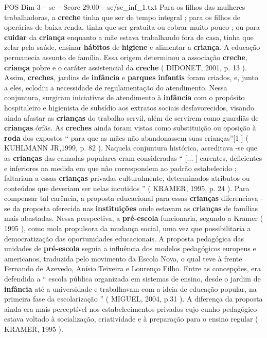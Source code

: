 \begin{textsample}{POS Dim 3 – se – Score 29.00 – se/se\_inf\_1.txt}
Para os filhos das mulheres trabalhadoras, a \textbf{creche} tinha que ser de tempo integral ; para os filhos de operárias de baixa renda, tinha que ser gratuita ou cobrar muito pouco ; ou para \textbf{cuidar} da \textbf{criança} enquanto a mãe estava trabalhando fora de casa, tinha que zelar pela saúde, ensinar \textbf{hábitos} de \textbf{higiene} e alimentar a \textbf{criança}.
A educação permanecia assunto de família.
Essa origem determinou a associação \textbf{creche}, \textbf{criança} pobre e o caráter assistencial da \textbf{creche} ( DIDONET, 2001, p. 13 ).
Assim, \textbf{creches}, jardins de \textbf{infância} e \textbf{parques} \textbf{infantis} foram criados, e, junto a eles, eclodiu a necessidade de regulamentação do atendimento.
Nessa conjuntura, surgiram iniciativas de atendimento à \textbf{infância} com o propósito hospitaleiro e higienista de subsídio aos extratos sociais desfavorecidos, visando ainda afastar as \textbf{crianças} do trabalho servil, além de servirem como guardiãs de \textbf{crianças} órfãs.
As \textbf{creches} ainda foram vistas como substituição ou oposição à \textbf{roda} dos expostos “ para que as mães não abandonassem suas crianças”[1 ] ( KUHLMANN JR,1999, p. 82 ).
Naquela conjuntura histórica, acreditava -se que as \textbf{crianças} das camadas populares eram consideradas “ [... ] carentes, deficientes e inferiores na medida em que não correspondem ao padrão estabelecido ; faltariam a essas \textbf{crianças} privadas culturalmente, determinados atributos ou conteúdos que deveriam ser nelas incutidos ” ( KRAMER, 1995, p. 24 ).
Para compensar tal carência, a proposta educacional para essas \textbf{crianças} diferenciava -se da proposta oferecida nas \textbf{instituições} onde estavam as \textbf{crianças} de famílias mais abastadas.
Nessa perspectiva, a \textbf{pré-escola} funcionaria, segundo a Kramer ( 1995 ), como mola propulsora da mudança social, uma vez que possibilitaria a democratização das oportunidades educacionais.
A proposta pedagógica das unidades de \textbf{pré-escola} seguia a influência dos modelos pedagógicos europeus e americanos, traduzida pelo movimento da Escola Nova, o qual teve à frente Fernando de Azevedo, Anísio Teixeira e Lourenço Filho.
Entre as concepções, era defendida a “ escola pública organizada em sistemas de ensino, desde o jardim de \textbf{infância} até a universidade e trabalhavam com a ideia de educação popular, na primeira fase da escolarização ” ( MIGUEL, 2004, p.31 ).
A diferença da proposta ainda era mais perceptível nos estabelecimentos privados cujo cunho pedagógico estava voltado à socialização, criatividade e à preparação para o ensino regular ( KRAMER, 1995 ).

\end{textsample}
